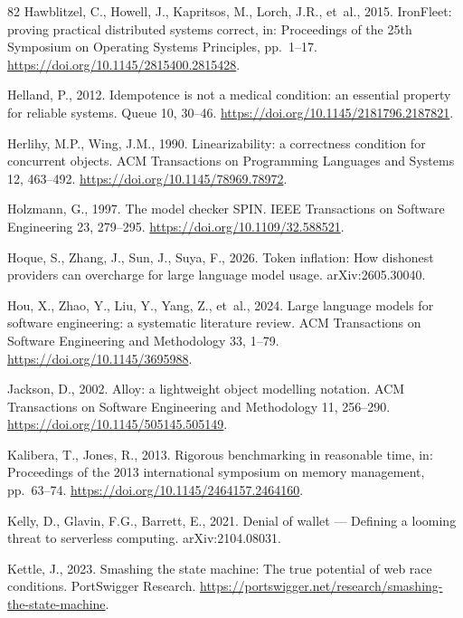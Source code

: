 \documentclass[preprint,3p,authoryear,12pt]{elsarticle}
\begin{document}
\begin{thebibliography}{82}
Hawblitzel, C., Howell, J., Kapritsos, M., Lorch, J.R., et~al., 2015. IronFleet: proving practical distributed systems correct, in: Proceedings of the 25th Symposium on Operating Systems Principles, pp.~1--17. \url{https://doi.org/10.1145/2815400.2815428}.

Helland, P., 2012. Idempotence is not a medical condition: an essential property for reliable systems. Queue 10, 30--46. \url{https://doi.org/10.1145/2181796.2187821}.

Herlihy, M.P., Wing, J.M., 1990. Linearizability: a correctness condition for concurrent objects. ACM Transactions on Programming Languages and Systems 12, 463--492. \url{https://doi.org/10.1145/78969.78972}.

Holzmann, G., 1997. The model checker SPIN. IEEE Transactions on Software Engineering 23, 279--295. \url{https://doi.org/10.1109/32.588521}.

Hoque, S., Zhang, J., Sun, J., Suya, F., 2026. Token inflation: How dishonest providers
can overcharge for large language model usage. arXiv:2605.30040.

Hou, X., Zhao, Y., Liu, Y., Yang, Z., et~al., 2024. Large language models for software engineering: a systematic literature review. ACM Transactions on Software Engineering and Methodology 33, 1--79. \url{https://doi.org/10.1145/3695988}.

Jackson, D., 2002. Alloy: a lightweight object modelling notation. ACM Transactions on Software Engineering and Methodology 11, 256--290. \url{https://doi.org/10.1145/505145.505149}.

Kalibera, T., Jones, R., 2013. Rigorous benchmarking in reasonable time, in: Proceedings of the 2013 international symposium on memory management, pp.~63--74. \url{https://doi.org/10.1145/2464157.2464160}.

Kelly, D., Glavin, F.G., Barrett, E., 2021. Denial of wallet --- Defining a looming
threat to serverless computing. arXiv:2104.08031.

Kettle, J., 2023. Smashing the state machine: The true potential of web race
conditions. PortSwigger Research.
\url{https://portswigger.net/research/smashing-the-state-machine}.


\end{thebibliography}
\end{document}

